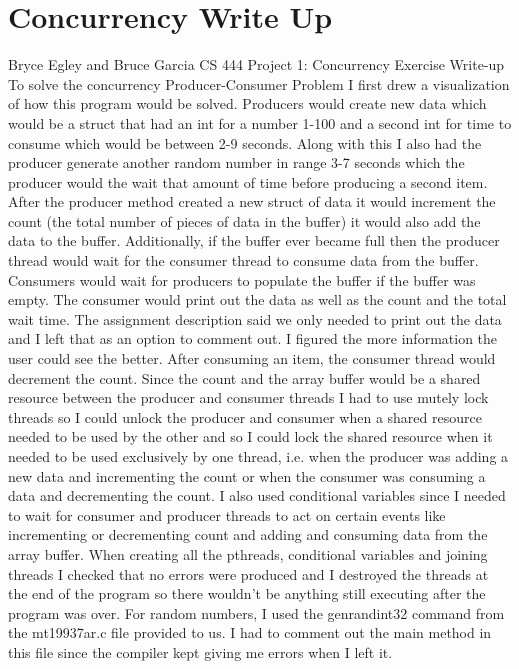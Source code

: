 \documentclass{article}
\begin{document}
\section*{Concurrency Write Up}
Bryce Egley and Bruce Garcia
\newline
CS 444 Project 1: Concurrency Exercise Write-up
\newline
\newline
To solve the concurrency Producer-Consumer Problem I first drew a visualization of how this program would be solved. 
\newline
\newline
Producers would create new data which would be a struct that had an int for a number 1-100 and a second int for time to consume which would be between 2-9 seconds. Along with this I also had the producer generate another random number in range 3-7 seconds which the producer would the wait that amount of time before producing a second item. After the producer method created a new struct of data it would increment the count (the total number of pieces of data in the buffer) it would also add the data to the buffer. Additionally, if the buffer ever became full then the producer thread would wait for the consumer thread to consume data from the buffer. 
\newline
\newline
Consumers would wait for producers to populate the buffer if the buffer was empty. The consumer would print out the data as well as the count and the total wait time. The assignment description said we only needed to print out the data and I left that as an option to comment out. I figured the more information the user could see the better. After consuming an item, the consumer thread would decrement the count. 
\newline
\newline
Since the count and the array buffer would be a shared resource between the producer and consumer threads I had to use mutely lock threads so I could unlock the producer and consumer when a shared resource needed to be used by the other and so I could lock the shared resource when it needed to be used exclusively by one thread, i.e. when the producer was adding a new data and incrementing the count or when the consumer was consuming a data and decrementing the count. I also used conditional variables since I needed to wait for consumer and producer threads to act on certain events like incrementing or decrementing count and adding and consuming data from the array buffer.
\newline
\newline
When creating all the pthreads, conditional variables and joining threads I checked that no errors were produced and I destroyed the threads at the end of the program so there wouldn’t be anything still executing after the program was over. For random numbers, I used the genrandint32 command from the mt19937ar.c file provided to us. I had to comment out the main method in this file since the compiler kept giving me errors when I left it.
\end{document}
